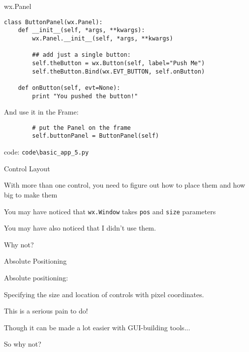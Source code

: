 \documentclass{beamer}
\begin{document}
\begin{frame}[fragile]{wx.Panel}

\begin{verbatim}
class ButtonPanel(wx.Panel):
    def __init__(self, *args, **kwargs):
        wx.Panel.__init__(self, *args, **kwargs)

        ## add just a single button:
        self.theButton = wx.Button(self, label="Push Me")
        self.theButton.Bind(wx.EVT_BUTTON, self.onButton)
                                   
    def onButton(self, evt=None):
        print "You pushed the button!"
\end{verbatim}
And use it in the Frame:
\begin{verbatim}
        # put the Panel on the frame
        self.buttonPanel = ButtonPanel(self)
\end{verbatim}

\vfill
code: \verb`code\basic_app_5.py`
\end{frame}

\begin{frame}[fragile]{Control Layout}

{\Large With more than one control, you need to figure out how to place them 
and how big to make them}

\vfill
{\Large You may have noticed that \verb`wx.Window` takes \verb`pos` and \verb`size` parameters}

\vfill
{\Large You may have also noticed that I didn't use them.}

\vfill
{\Large Why not?}

\end{frame}

\begin{frame}[fragile]{Absolute Positioning}

{\LARGE Absolute positioning:}

\vfill
{\Large Specifying the size and location of controls with pixel coordinates.}

\vfill
{\Large This is a serious pain to do!}

\vfill
{\Large Though it can be made a lot easier with GUI-building tools...}

\vfill
{\Large So why not?}

\end{frame}
\end{document}
